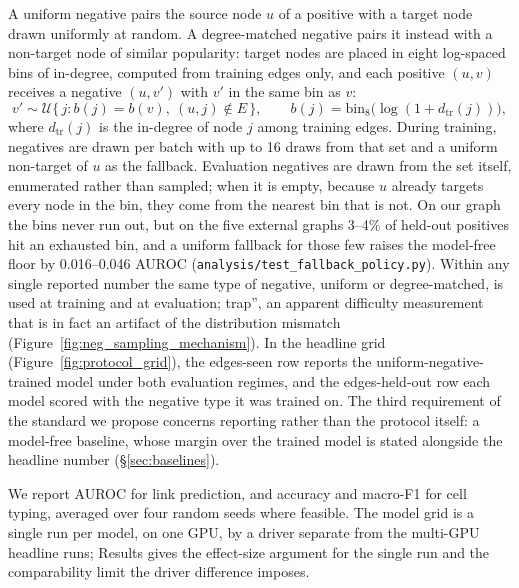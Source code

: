 \documentclass[review]{elsarticle}
\begin{document}
\label{sec:methods_negatives}%
A uniform negative pairs the source node $u$ of a positive with a target node drawn
uniformly at random. A degree-matched negative pairs it instead with a non-target node of
similar popularity: target nodes are placed in eight log-spaced bins of in-degree,
computed from training edges only, and each positive $(u,v)$ receives a negative $(u,v')$
with $v'$ in the same bin as $v$:
\begin{equation}
v' \sim \mathcal{U}\bigl\{\, j : b(j) = b(v),\ (u,j)\notin E \,\bigr\},
\qquad b(j)=\mathrm{bin}_8\bigl(\log(1+d_{\mathrm{tr}}(j))\bigr),
\label{eq:matched}
\end{equation}
where $d_{\mathrm{tr}}(j)$ is the in-degree of node $j$ among training edges.
During training, negatives are drawn per batch with up to 16 draws from that set and a uniform
non-target of $u$ as the fallback. Evaluation negatives are drawn from the set itself, enumerated
rather than sampled; when it is empty, because $u$ already targets every node in the bin, they come
from the nearest bin that is not. On our graph the bins never run out, but on the five external
graphs 3--4\% of held-out positives hit an exhausted bin, and a uniform fallback for those few
raises the model-free floor by 0.016--0.046 AUROC (\texttt{analysis/test\_fallback\_policy.py}).
Within any single reported number the same type of negative, uniform or degree-matched, is used
at training and at evaluation;
trap'', an apparent difficulty measurement that is in fact an artifact of the distribution
mismatch (Figure~\ref{fig:neg_sampling_mechanism}). In the headline grid
(Figure~\ref{fig:protocol_grid}), the edges-seen row reports the uniform-negative-trained model
under both evaluation regimes, and the edges-held-out row each model scored with the negative
type it was trained on. The third requirement of the standard we
propose concerns reporting rather than the protocol itself: a model-free baseline, whose
margin over the trained model is stated alongside the headline number
(\S\ref{sec:baselines}).

We report AUROC for link prediction, and accuracy and macro-F1 for cell
typing, averaged over four random seeds where feasible. The model grid is a
single run per model, on one GPU, by a driver separate from the multi-GPU
headline runs; Results gives the effect-size argument for the single run and the
comparability limit the driver difference imposes.
\end{document}
